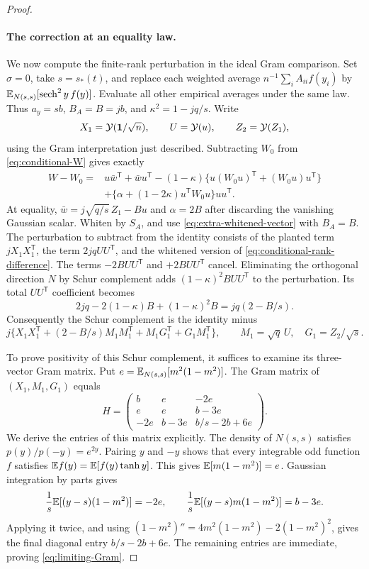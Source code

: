 \begin{proof}
\paragraph{The correction at an equality law.}
We now compute the finite-rank perturbation in the ideal Gram comparison.
Set $\sigma=0$, take $s=s_*(t)$, and replace each weighted average
$n^{-1}\sum_i A_{ii}f(y_i)$ by
$\mathbb E_{N(s,s)}[\operatorname{sech}^2 y\,f(y)]$. Evaluate all other empirical
averages under the same law. Thus $a_y=sb$, $B_A=B=jb$, and
$\kappa^2=1-jq/s$. Write
\[
 X_1=\mathcal Y(\mathbf 1/\sqrt n),\qquad
 U=\mathcal Y(u),\qquad Z_2=\mathcal Y(Z_1),
\]
using the Gram interpretation just described. Subtracting
$W_0$ from \eqref{eq:conditional-W} gives exactly
\begin{equation}
 \begin{split}
 W-W_0={}&u\bar w^{\mathsf T}+\bar w u^{\mathsf T}
 -(1-\kappa)\{u(W_0u)^{\mathsf T}+(W_0u)u^{\mathsf T}\}\\
 &+\{\alpha+(1-2\kappa)u^{\mathsf T}W_0u\}uu^{\mathsf T}.
 \end{split}
 \label{eq:conditional-rank-difference}
\end{equation}
At equality, $\bar w=j\sqrt{q/s}\,Z_1-Bu$ and $\alpha=2B$ after
discarding the vanishing Gaussian scalar.  Whiten by $S_A$, and use
\eqref{eq:extra-whitened-vector} with $B_A=B$.  The perturbation to
subtract from the identity consists of the planted term
$jX_1X_1^{\mathsf T}$, the term $2jqUU^{\mathsf T}$, and the whitened
version of \eqref{eq:conditional-rank-difference}.  The terms
$-2BUU^{\mathsf T}$ and $+2BUU^{\mathsf T}$ cancel.  Eliminating the
orthogonal direction $N$ by Schur complement adds
$(1-\kappa)^2BUU^{\mathsf T}$ to the perturbation.  Its total
$UU^{\mathsf T}$ coefficient becomes
\[
 2jq-2(1-\kappa)B+(1-\kappa)^2B
 =jq(2-B/s).
\]
Consequently the Schur complement is the identity minus
\begin{equation}
 j\{X_1X_1^{\mathsf T}+(2-B/s)M_1M_1^{\mathsf T}
                 +M_1G_1^{\mathsf T}+G_1M_1^{\mathsf T}\},
 \qquad M_1=\sqrt q\,U,\quad G_1=Z_2/\sqrt s.
 \label{eq:limiting-rank-perturbation}
\end{equation}

To prove positivity of this Schur complement, it suffices to examine
its three-vector Gram matrix. Put
$e=\mathbb E_{N(s,s)}[m^2(1-m^2)]$.  The Gram matrix of
$(X_1,M_1,G_1)$ equals
\begin{equation}
 H=\begin{pmatrix}
 b&e&-2e\\
 e&e&b-3e\\
 -2e&b-3e&b/s-2b+6e
 \end{pmatrix}.
 \label{eq:limiting-Gram}
\end{equation}
We derive the entries of this matrix explicitly. The density of
$N(s,s)$ satisfies
$p(y)/p(-y)=e^{2y}$.  Pairing $y$ and $-y$ shows that every integrable
odd function $f$ satisfies $\mathbb E f(y)=\mathbb E[f(y)\tanh y]$.  This gives
$\mathbb E[m(1-m^2)]=e$.  Gaussian integration by parts gives
\[
 \frac1s\mathbb E[(y-s)(1-m^2)]=-2e,\qquad
 \frac1s\mathbb E[(y-s)m(1-m^2)]=b-3e.
\]
Applying it twice, and using
$(1-m^2)''=4m^2(1-m^2)-2(1-m^2)^2$, gives the final diagonal entry
$b/s-2b+6e$.  The remaining entries are immediate, proving
\eqref{eq:limiting-Gram}.


\end{proof}
